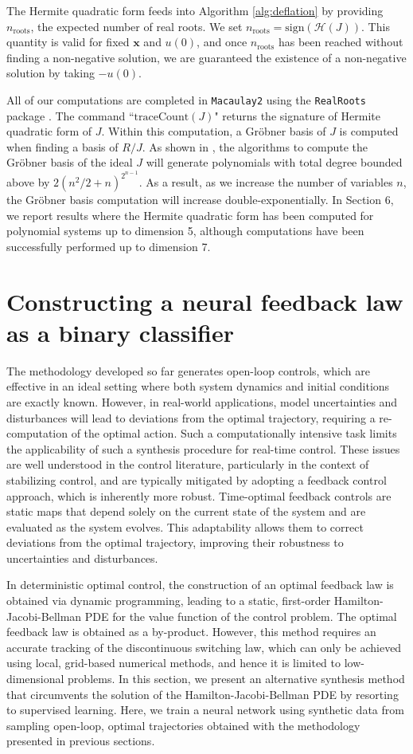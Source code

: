 \documentclass[11pt]{amsart}
\newcommand{\Sign}{\mathrm{sign}}
\theoremstyle{definition}
\theoremstyle{remark}
\numberwithin{equation}{section}
\begin{document}
The Hermite quadratic form feeds into Algorithm \ref{alg:deflation} by providing $n_\text{roots}$, the expected number of real roots. We set $n_\text{roots}=\Sign(\mathcal{H}(J))$. This quantity is valid for fixed $\bm{x}$ and $u(0)$, and once $n_\text{roots}$ has been reached without finding a non-negative solution, we are guaranteed the existence of a non-negative solution by taking $-u(0)$.

All of our computations are completed in \texttt{Macaulay2} using the \texttt{RealRoots} package \cite{M2RealRoots}. The command ``$\mathrm{traceCount}(J)$" returns the signature of Hermite quadratic form of $J$. Within this computation, a Gröbner basis of $J$ is computed when finding a basis of $R/J$. As shown in \cite{GroebnerComplexity}, the algorithms to compute the Gröbner basis of the ideal $J$ will generate polynomials with total degree bounded above by $2(n^2/2+n)^{2^{n-1}}$. As a result, as we increase the number of variables $n$, the Gröbner basis computation will increase double-exponentially. In Section 6, we report results where the Hermite quadratic form has been computed for polynomial systems up to dimension 5, although computations have been successfully performed up to dimension 7. 

\section{Constructing a neural feedback law as a binary classifier}
The methodology developed so far generates open-loop controls, which are effective in an ideal setting where both system dynamics and initial conditions are exactly known. However, in real-world applications, model uncertainties and disturbances will lead to deviations from the optimal trajectory, requiring a re-computation of the optimal action. Such a computationally intensive task limits the applicability of such a synthesis procedure for real-time control. These issues are well understood in the control literature, particularly in the context of stabilizing control, and are typically mitigated by adopting a feedback control approach, which is inherently more robust. Time-optimal feedback controls are static maps that depend solely on the current state of the system and are evaluated as the system evolves. This adaptability allows them to correct deviations from the optimal trajectory, improving their robustness to uncertainties and disturbances.

In deterministic optimal control, the construction of an optimal feedback law is obtained via dynamic programming, leading to a static, first-order Hamilton-Jacobi-Bellman PDE for the value function of the control problem. The optimal feedback law is obtained as a by-product.  However, this method requires an accurate tracking of the discontinuous switching law, which can only be achieved using local, grid-based numerical methods, and hence it is limited to low-dimensional problems. In this section, we present an alternative synthesis method that circumvents the solution of the Hamilton-Jacobi-Bellman PDE by resorting to supervised learning. Here, we train a neural network using synthetic data from sampling open-loop, optimal trajectories obtained with the methodology presented in previous sections.  
\end{document}
